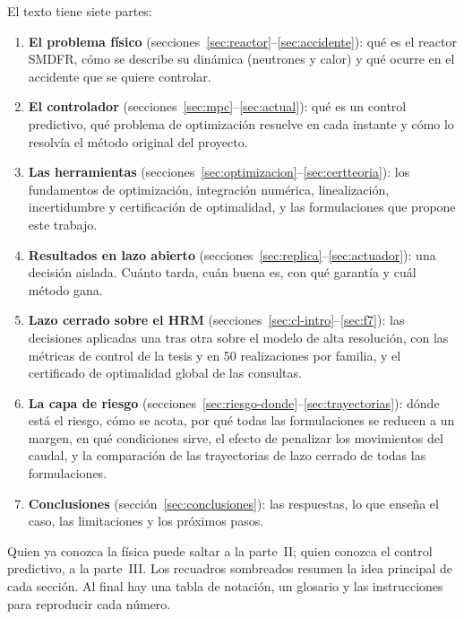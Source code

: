 El texto tiene siete partes:
\begin{enumerate}[label=\textbf{Parte \Roman*.}, leftmargin=*]
  \item \textbf{El problema físico} (secciones~\ref{sec:reactor}--\ref{sec:accidente}): qué
        es el reactor SMDFR, cómo se describe su dinámica (neutrones y calor) y qué ocurre en
        el accidente que se quiere controlar.
  \item \textbf{El controlador} (secciones~\ref{sec:mpc}--\ref{sec:actual}): qué es un
        control predictivo, qué problema de optimización resuelve en cada instante y cómo lo
        resolvía el método original del proyecto.
  \item \textbf{Las herramientas} (secciones~\ref{sec:optimizacion}--\ref{sec:certteoria}):
        los fundamentos de optimización, integración numérica, linealización, incertidumbre y
        certificación de optimalidad, y las formulaciones que propone este trabajo.
  \item \textbf{Resultados en lazo abierto} (secciones~\ref{sec:replica}--\ref{sec:actuador}):
        una decisión aislada. Cuánto tarda, cuán buena es, con qué garantía y cuál método gana.
  \item \textbf{Lazo cerrado sobre el HRM} (secciones~\ref{sec:cl-intro}--\ref{sec:f7}):
        las decisiones aplicadas una tras otra sobre el modelo de alta resolución, con las
        métricas de control de la tesis y en 50 realizaciones por familia, y el certificado de
        optimalidad global de las consultas.
  \item \textbf{La capa de riesgo} (secciones~\ref{sec:riesgo-donde}--\ref{sec:trayectorias}):
        dónde está el riesgo, cómo se acota, por qué todas las formulaciones se reducen a un
        margen, en qué condiciones sirve, el efecto de penalizar los movimientos del caudal, y la
        comparación de las trayectorias de lazo cerrado de todas las formulaciones.
  \item \textbf{Conclusiones} (sección~\ref{sec:conclusiones}): las respuestas, lo que enseña
        el caso, las limitaciones y los próximos pasos.
\end{enumerate}
Quien ya conozca la física puede saltar a la parte~II; quien conozca el control predictivo,
a la parte~III. Los recuadros sombreados resumen la idea principal de cada sección. Al final
hay una tabla de notación, un glosario y las instrucciones para reproducir cada número.

